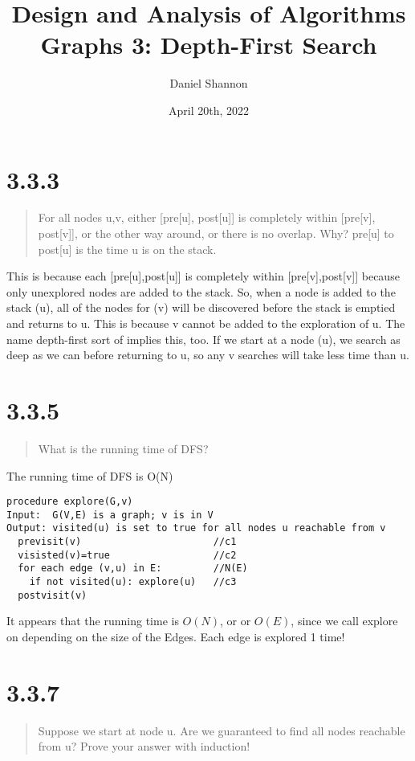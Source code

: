 \documentclass[12pt, letterpaper, twoside]{article}
\title{%
Design and Analysis of Algorithms\\
\large Graphs 3: Depth-First Search
}
\author{Daniel Shannon}
\date{April 20th, 2022}
\begin{document}
\begin{titlepage}
\maketitle
\end{titlepage}
\section*{3.3.3}
\begin{quote}
    For all nodes u,v, either [pre[u], post[u]] is completely within [pre[v], post[v]], or the other way around, or there is no overlap. Why?
    pre[u] to post[u] is the time u is on the stack.
\end{quote}
This is because each [pre[u],post[u]] is completely within [pre[v],post[v]] because only unexplored nodes are added to the stack.
So, when a node is added to the stack (u), all of the nodes for (v) will be discovered before the stack is emptied and returns to u. This is because v cannot be added to the exploration of u.%
The name depth-first sort of implies this, too. If we start at a node (u), we search as deep as we can before returning to u, so any v searches will take less time than u.
\section*{3.3.5}
\begin{quote}
  What is the running time of DFS?
\end{quote}
The running time of DFS is O(N)
\begin{lstlisting}
procedure explore(G,v)
Input:  G(V,E) is a graph; v is in V
Output: visited(u) is set to true for all nodes u reachable from v
  previsit(v)                       //c1
  visisted(v)=true                  //c2
  for each edge (v,u) in E:         //N(E)
    if not visited(u): explore(u)   //c3
  postvisit(v)
\end{lstlisting}
It appears that the running time is $O(N)$, or or $O(E)$, since we call explore on depending on the size of the Edges.
Each edge is explored 1 time!
\section*{3.3.7}
\begin{quote}
  Suppose we start at node u. Are we guaranteed to find all nodes reachable from u?
  Prove your answer with induction!
\end{quote}
\end{document}

